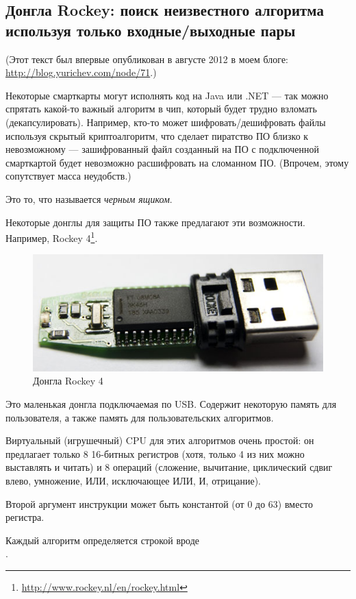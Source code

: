 ﻿\subsection{Донгла Rockey: поиск неизвестного алгоритма используя только входные/выходные пары}

(Этот текст был впервые опубликован в августе 2012 в моем блоге: \url{http://blog.yurichev.com/node/71}.)

Некоторые смарткарты могут исполнять код на Java или .NET --- так можно спрятать какой-то важный алгоритм в чип,
который будет трудно взломать (декапсулировать).
Например, кто-то может шифровать/дешифровать файлы используя скрытый криптоалгоритм, что сделает
пиратство ПО близко к невозможному --- зашифрованный файл созданный на ПО с подключенной смарткартой
будет невозможно расшифровать на сломанном ПО.
(Впрочем, этому сопутствует масса неудобств.)

Это то, что называется \textit{черным ящиком}.

Некоторые донглы для защиты ПО также предлагают эти возможности.
Например, Rockey 4\footnote{\url{http://www.rockey.nl/en/rockey.html}}.

\begin{figure}[H]
\centering
\includegraphics[scale=2]{pgm_synth/rockey/rockey_4.jpg}
\caption{Донгла Rockey 4}
\end{figure}

Это маленькая донгла подключаемая по USB. Содержит некоторую память для пользователя, а также память для пользовательских
алгоритмов.

Виртуальный (игрушечный) CPU для этих алгоритмов очень простой: он предлагает только 8 16-битных регистров
(хотя, только 4 из них можно выставлять и читать) и 8 операций
(сложение, вычитание, циклический сдвиг влево, умножение, ИЛИ, исключающее ИЛИ, И, отрицание).

Второй аргумент инструкции может быть константой (от 0 до 63) вместо регистра.

Каждый алгоритм определяется строкой вроде \\
.

